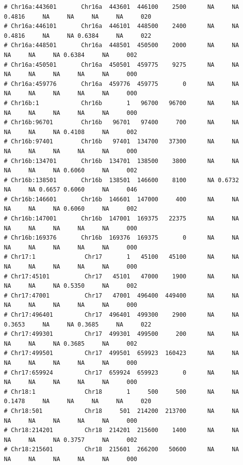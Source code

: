 \documentclass{article}\usepackage[]{graphicx}\usepackage[]{color}
\makeatletter
\newenvironment{kframe}{%
 \def\at@end@of@kframe{}%
 \ifinner\ifhmode%
  \def\at@end@of@kframe{\end{minipage}}%
  \begin{minipage}{\columnwidth}%
 \fi\fi%
 \def\FrameCommand##1{\hskip\@totalleftmargin \hskip-\fboxsep
 \colorbox{shadecolor}{##1}\hskip-\fboxsep
     \hskip-\linewidth \hskip-\@totalleftmargin \hskip\columnwidth}%
 \MakeFramed {\advance\hsize-\width
   \@totalleftmargin\z@ \linewidth\hsize
   \@setminipage}}%
 {\par\unskip\endMakeFramed%
 \at@end@of@kframe}
\newenvironment{knitrout}{}{} %
\makeatother
\begin{document}
\begin{knitrout}
\begin{kframe}
\begin{verbatim}
# Chr16a:443601       Chr16a  443601  446100    2500      NA     NA 0.4816     NA     NA     NA     NA     020
# Chr16a:446101       Chr16a  446101  448500    2400      NA     NA 0.4816     NA     NA 0.6384     NA     022
# Chr16a:448501       Chr16a  448501  450500    2000      NA     NA     NA     NA     NA 0.6384     NA     002
# Chr16a:450501       Chr16a  450501  459775    9275      NA     NA     NA     NA     NA     NA     NA     000
# Chr16a:459776       Chr16a  459776  459775       0      NA     NA     NA     NA     NA     NA     NA     000
# Chr16b:1            Chr16b       1   96700   96700      NA     NA     NA     NA     NA     NA     NA     000
# Chr16b:96701        Chr16b   96701   97400     700      NA     NA     NA     NA     NA 0.4108     NA     002
# Chr16b:97401        Chr16b   97401  134700   37300      NA     NA     NA     NA     NA     NA     NA     000
# Chr16b:134701       Chr16b  134701  138500    3800      NA     NA     NA     NA     NA 0.6060     NA     002
# Chr16b:138501       Chr16b  138501  146600    8100      NA 0.6732     NA     NA 0.6657 0.6060     NA     046
# Chr16b:146601       Chr16b  146601  147000     400      NA     NA     NA     NA     NA 0.6060     NA     002
# Chr16b:147001       Chr16b  147001  169375   22375      NA     NA     NA     NA     NA     NA     NA     000
# Chr16b:169376       Chr16b  169376  169375       0      NA     NA     NA     NA     NA     NA     NA     000
# Chr17:1              Chr17       1   45100   45100      NA     NA     NA     NA     NA     NA     NA     000
# Chr17:45101          Chr17   45101   47000    1900      NA     NA     NA     NA     NA 0.5350     NA     002
# Chr17:47001          Chr17   47001  496400  449400      NA     NA     NA     NA     NA     NA     NA     000
# Chr17:496401         Chr17  496401  499300    2900      NA     NA 0.3653     NA     NA 0.3685     NA     022
# Chr17:499301         Chr17  499301  499500     200      NA     NA     NA     NA     NA 0.3685     NA     002
# Chr17:499501         Chr17  499501  659923  160423      NA     NA     NA     NA     NA     NA     NA     000
# Chr17:659924         Chr17  659924  659923       0      NA     NA     NA     NA     NA     NA     NA     000
# Chr18:1              Chr18       1     500     500      NA     NA 0.1478     NA     NA     NA     NA     020
# Chr18:501            Chr18     501  214200  213700      NA     NA     NA     NA     NA     NA     NA     000
# Chr18:214201         Chr18  214201  215600    1400      NA     NA     NA     NA     NA 0.3757     NA     002
# Chr18:215601         Chr18  215601  266200   50600      NA     NA     NA     NA     NA     NA     NA     000

\end{verbatim}
\end{kframe}
\end{knitrout}
\end{document}
